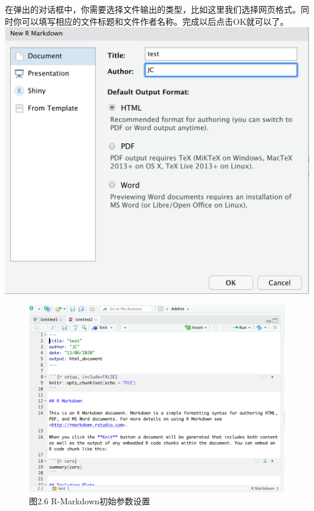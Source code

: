 \documentclass[]{book}
\begin{document}
在弹出的对话框中，你需要选择文件输出的类型，比如这里我们选择网页格式。同时你可以填写相应的文件标题和文件作者名称。完成以后点击OK就可以了。
\includegraphics{images/2.5.png}

\begin{figure}
\centering
\includegraphics{images/2.6.png}
\caption{图2.6 R-Markdown初始参数设置}
\end{figure}
\end{document}
